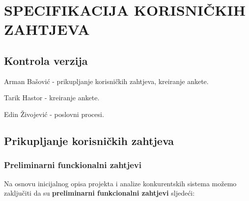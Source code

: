 
\chapter{SPECIFIKACIJA KORISNIČKIH ZAHTJEVA}

\sloppy
\section*{Kontrola verzija}


\noindent Arman Bašović - prikupljanje korisničkih zahtjeva, kreiranje ankete.

\noindent Tarik Hastor - kreiranje ankete.

\noindent Edin Živojević - poslovni procesi.

\sloppy
\section{Prikupljanje korisničkih zahtjeva}  
\subsection{Preliminarni funckionalni zahtjevi}
Na osnovu inicijalnog opisa projekta i analize konkurentskih sistema možemo zaključiti da su  \textbf{preliminarni funkcionalni zahtjevi} sljedeći:

